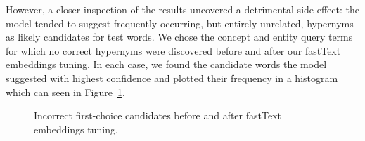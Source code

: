 However, a closer inspection of the results uncovered a detrimental side-effect: the model tended to suggest frequently occurring, but entirely unrelated, hypernyms as likely candidates for test words.  We chose the concept and entity query terms for which no correct hypernyms were discovered before and after our fastText embeddings tuning.  In each case, we found the candidate words the model suggested with highest confidence and plotted their frequency in a histogram which can seen in Figure~\ref{fig:confident_bad_prediction_before_after_tuning}.
\begin{figure}[!ht]
    \centering
    \qquad
    \caption{Incorrect first-choice candidates before and after fastText embeddings tuning. }    
    \label{fig:confident_bad_prediction_before_after_tuning}
\end{figure}
